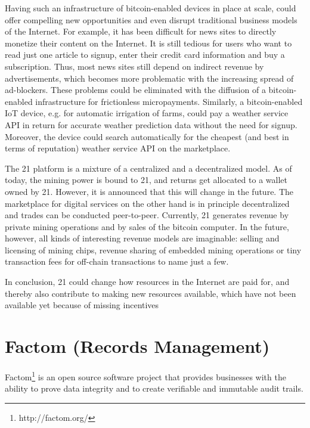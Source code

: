 Having such an infrastructure of bitcoin-enabled devices in place at scale, could 
offer compelling new opportunities and even disrupt traditional business models 
of the Internet. For example, it has been difficult for news sites to directly 
monetize their content on the Internet. It is still tedious for users who want 
to read just one article to signup, enter their credit card information and buy 
a subscription. Thus, most news sites still depend on indirect revenue by advertisements, 
which becomes more problematic with the increasing spread of ad-blockers. These 
problems could be eliminated with the diffusion of a bitcoin-enabled infrastructure 
for frictionless micropayments. Similarly, a bitcoin-enabled IoT device, e.g. for 
automatic irrigation of farms, could pay a weather service API in return for accurate 
weather prediction data without the need for signup. Moreover, the device could 
search automatically for the cheapest (and best in terms of reputation) weather 
service API on the marketplace.

The 21 platform is a mixture of a centralized and a decentralized model. As of 
today, the mining power is bound to 21, and returns get allocated to a wallet owned 
by 21. However, it is announced that this will change in the future. The marketplace 
for digital services on the other hand is in principle decentralized and trades 
can be conducted peer-to-peer. Currently, 21 generates revenue by private mining 
operations and by sales of the bitcoin computer. In the future, however, all kinds 
of interesting revenue models are imaginable: selling and licensing of mining chips, 
revenue sharing of embedded mining operations or tiny transaction fees for off-chain 
transactions to name just a few. 

In conclusion, 21 could change how resources in the Internet are paid for, and 
thereby also contribute to making new resources available, which have not been 
available yet because of missing incentives

\section{Factom (Records Management)}
\label{sec:ecofactom}

Factom\footnote{http://factom.org/} is an open source software project that provides businesses with 
the ability to prove data integrity and to create verifiable and immutable audit 
trails. 

